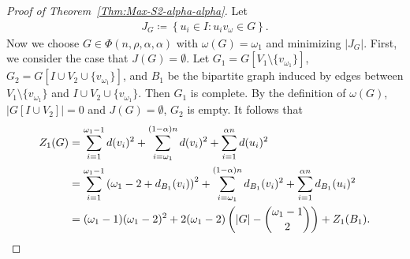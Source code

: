 \documentclass[11pt,a4paper]{article}
\begin{document}
\begin{proof}[Proof of Theorem~\ref{Thm:Max-S2-alpha-alpha}]
Let 
\begin{align*}
J_{G} \coloneqq \left\{u_i \in I \colon u_i v_{\omega} \in G\right\}. 
\end{align*}
Now we choose $G \in \Phi(n, \rho, \alpha, \alpha)$  with $\omega(G) = \omega_1$ and minimizing $|J_G|$. 
First, we consider the case that $J(G) = \emptyset$. 
Let $G_1 = G[V_1 \setminus\{v_{\omega_1}\}]$, $G_2 = G[I \cup V_2\cup \{v_{\omega_1}\}]$, and $B_1$ be the bipartite graph induced by edges between $V_1 \setminus \{v_{\omega_1}\}$ and $I \cup V_2 \cup \{v_{\omega_1}\}$. 
Then $G_1$ is complete. 
By the definition of $\omega(G)$, $\left|G[I \cup V_2]\right| = 0$ and $J(G) = \emptyset$, $G_2$ is empty. 
It follows that
\begin{align}\label{EQ:Z_{1}(G)_equals_Z_{1}(B_1)}
Z_{1}(G) 
&= \sum_{i=1}^{\omega_1 -1} d(v_i)^2 + \sum_{i=\omega_1}^{(1-\alpha)n} d(v_i)^2 + \sum_{i=1}^{\alpha n} d(u_i)^2 \notag \\
&= \sum_{i=1}^{\omega_1 -1}\left(\omega_1 -2 + d_{B_1}(v_i)\right)^2 + \sum_{i=\omega_1}^{(1-\alpha)n} d_{B_1}(v_i)^2 + \sum_{i=1}^{\alpha n } d_{B_1}(u_i)^2 \notag\\
&= (\omega_1-1)(\omega_1 -2)^2 + 2(\omega_1 -2) \left(|G|- \binom{\omega_1-1}{2} \right) + Z_{1}(B_1). 
\end{align}


\end{proof}
\end{document}
